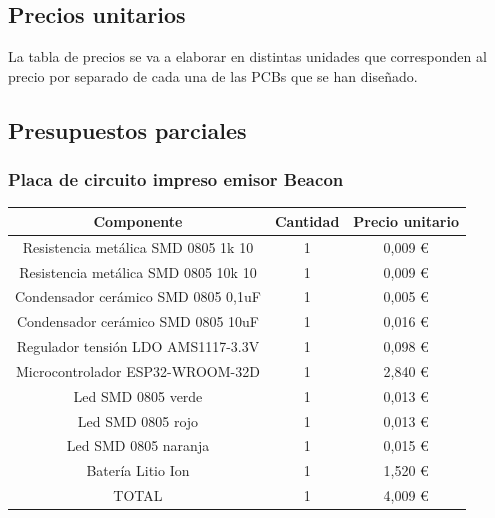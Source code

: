 \documentclass[paper=a4, fontsize=11pt,twoside]{scrartcl}	%
\begin{document}
    \subsection{Precios unitarios}
        La tabla de precios se va a elaborar en distintas unidades que corresponden al precio por separado de cada
        una de las PCBs que se han diseñado.
    \subsection{Presupuestos parciales}
            \subsubsection{Placa de circuito impreso emisor Beacon}
                \begin{center}
                    \begin{tabular}{||c | c |c ||} 
                    \hline
                    Componente & Cantidad & Precio unitario  \\ [0.5ex] 
                    \hline
                    Resistencia metálica SMD 0805 1k 10  	&1&	 0,009 € \\ 
                    Resistencia metálica SMD 0805 10k 10 	&1&	 0,009 € \\ 
                    Condensador cerámico SMD 0805 0,1uF  	&1&	 0,005 € \\ 
                    Condensador cerámico SMD 0805 10uF   	&1&	 0,016 € \\ 
                    Regulador tensión LDO AMS1117-3.3V   	&1&	 0,098 € \\ 
                    Microcontrolador ESP32-WROOM-32D     	&1&	 2,840 € \\ 
                    Led SMD 0805 verde                   	&1&	 0,013 € \\ 
                    Led SMD 0805 rojo                    	&1&	 0,013 € \\ 
                    Led SMD 0805 naranja                 	&1&	 0,015 € \\ 
                    Batería Litio Ion                    	&1&	 1,520 € \\ 
                    \hline
                    TOTAL                    	            &1&	 4,009 € \\ 
                \hline
                    \end{tabular}
                \end{center}
\end{document}
